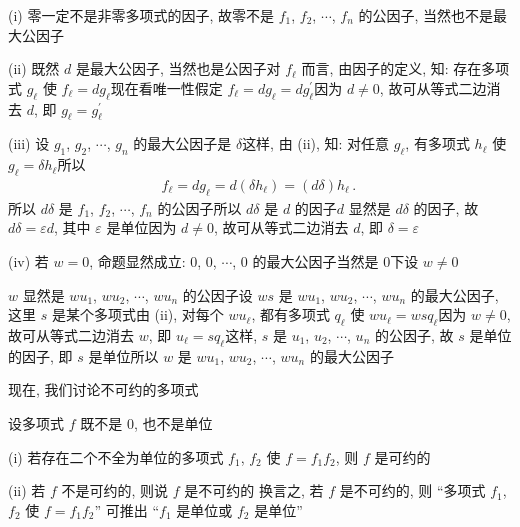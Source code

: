 \begin{pf}
    (i) 零一定不是非零多项式的因子, 故零不是 $f_1$, $f_2$, $\cdots$, $f_n$ 的公因子, 当然也不是最大公因子\period

    (ii) 既然 $d$ 是最大公因子, 当然也是公因子\period 对 $f_{\ell}$ 而言, 由因子的定义, 知: 存在多项式 $g_{\ell}$ 使 $f_{\ell} = dg_{\ell}$\period 现在看唯一性\period 假定 $f_{\ell} = dg_{\ell} = dg_{\ell}^{\prime}$\period 因为 $d \neq 0$, 故可从等式二边消去 $d$, 即 $g_{\ell} = g_{\ell}^{\prime}$\period

    (iii) 设 $g_1$, $g_2$, $\cdots$, $g_n$ 的最大公因子是 $\delta$\period 这样, 由 (ii), 知: 对任意 $g_{\ell}$, 有多项式 $h_{\ell}$ 使 $g_{\ell} = \delta h_{\ell}$\period 所以
    \begin{align*}
        f_{\ell} = dg_{\ell} = d(\delta h_{\ell}) = (d\delta) h_{\ell} \period
    \end{align*}
    所以 $d\delta$ 是 $f_1$, $f_2$, $\cdots$, $f_n$ 的公因子\period 所以 $d\delta$ 是 $d$ 的因子\period $d$ 显然是 $d\delta$ 的因子, 故 $d\delta = \varepsilon d$, 其中 $\varepsilon$ 是单位\period 因为 $d \neq 0$, 故可从等式二边消去 $d$, 即 $\delta = \varepsilon$\period

    (iv) 若 $w = 0$, 命题显然成立: $0$, $0$, $\cdots$, $0$ 的最大公因子当然是 $0$\period 下设 $w \neq 0$\period

    $w$ 显然是 $wu_1$, $wu_2$, $\cdots$, $wu_n$ 的公因子\period 设 $ws$ 是 $wu_1$, $wu_2$, $\cdots$, $wu_n$ 的最大公因子, 这里 $s$ 是某个多项式\period 由 (ii), 对每个 $wu_{\ell}$, 都有多项式 $q_{\ell}$ 使 $wu_{\ell} = wsq_{\ell}$\period 因为 $w \neq 0$, 故可从等式二边消去 $w$, 即 $u_{\ell} = sq_{\ell}$\period 这样, $s$ 是 $u_1$, $u_2$, $\cdots$, $u_n$ 的公因子, 故 $s$ 是单位的因子, 即 $s$ 是单位\period 所以 $w$ 是 $wu_1$, $wu_2$, $\cdots$, $wu_n$ 的最大公因子\period
\end{pf}

\myLine

现在, 我们讨论不可约的多项式\period

\begin{definition}
    设多项式 $f$ 既不是 $0$, 也不是单位\period

    (i) 若存在二个不全为单位的多项式 $f_1$, $f_2$ 使 $f = f_1 f_2$, 则 $f$ 是可约的 \period

    (ii) 若 $f$ 不是可约的, 则说 $f$ 是不可约的 \period 换言之, 若 $f$ 是不可约的, 则 ``多项式 $f_1$, $f_2$ 使 $f = f_1 f_2$'' 可推出 ``$f_1$ 是单位或 $f_2$ 是单位''\period
\end{definition}

